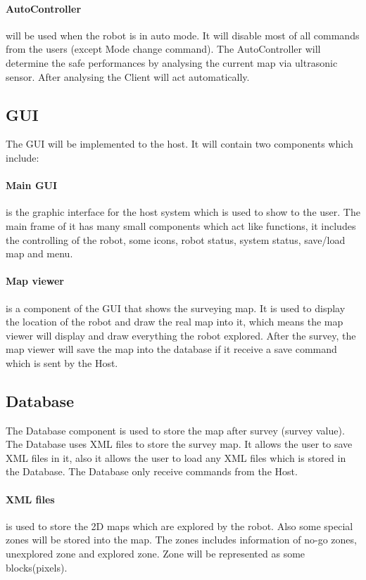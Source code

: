 \documentclass[11pt, a4paper]{report}
\begin{document}
\paragraph{AutoController} will be used when the robot is in auto mode. It will disable most of all commands from the users (except Mode change command). The AutoController will determine the safe performances by analysing the current map via ultrasonic sensor. After analysing the Client will act automatically.
\subsection{GUI} The GUI will be implemented to the host. It will contain two components which include:
\paragraph{Main GUI} is the graphic interface for the host system which is used to show to the user. The main frame of it has many small components which act like functions, it includes the controlling of the robot, some icons, robot status, system status, save/load map and menu.
\paragraph{Map viewer} is a component of the GUI that shows the surveying map. It is used to display the location of the robot and draw the real map into it, which means the map viewer will display and draw everything the robot explored. After the survey, the map viewer will save the map into the database if it receive a save command which is sent by the Host.
\subsection{Database} The Database component is used to store the map after survey (survey value). The Database uses XML files to store the survey map. It allows the user to save XML files in it, also it allows the user to load any XML files which is stored in the Database. The Database only receive commands from the Host.
\paragraph{XML files} is used to store the 2D maps which are explored by the robot. Also some special zones will be stored into the map. The zones includes information of no-go zones, unexplored zone and explored zone. Zone will be represented as some blocks(pixels).
\end{document}
